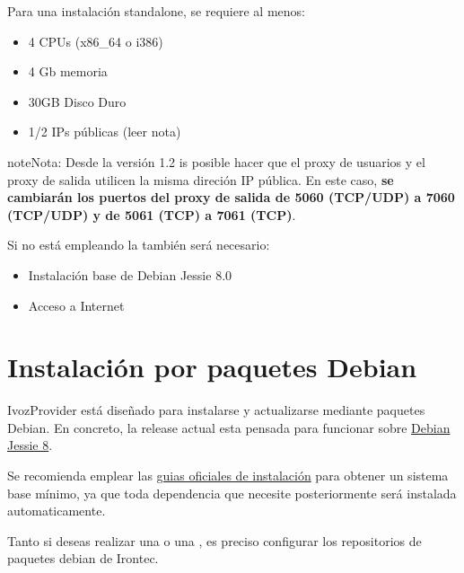 \documentclass[letterpaper,10pt,spanish]{sphinxmanual}
\begin{document}
Para una instalación standalone, se requiere al menos:
\begin{itemize}
\item {} 
4 CPUs (x86\_64 o i386)

\item {} 
4 Gb memoria

\item {} 
30GB Disco Duro

\item {} 
1/2 IPs públicas (leer nota)

\end{itemize}

\begin{notice}{note}{Nota:}
Desde la versión 1.2 is posible hacer que el proxy de usuarios y el proxy de salida utilicen la misma direción IP pública. En este caso, \textbf{se cambiarán los puertos del proxy de salida de 5060 (TCP/UDP) a 7060 (TCP/UDP) y de 5061 (TCP) a 7061 (TCP)}.
\end{notice}

Si no está empleando la {\hyperref[installation/cd_install:automatic\string-iso\string-cd\string-image]{}} también será necesario:
\begin{itemize}
\item {} 
Instalación base de Debian Jessie 8.0

\item {} 
Acceso a Internet

\end{itemize}


\section{Instalación por paquetes Debian}
\label{installation/debian_install::doc}\label{installation/debian_install:debian-packages-install}
IvozProvider está diseñado para instalarse y actualizarse mediante paquetes Debian. En concreto, la release actual esta pensada para funcionar sobre \href{https://www.debian.org/releases/jessie}{Debian Jessie 8}.

Se recomienda emplear las \href{https://www.debian.org/releases/jessie/installmanual}{guias oficiales de instalación} para obtener un sistema base mínimo, ya que toda dependencia que necesite posteriormente será instalada automaticamente.

Tanto si deseas realizar una {\hyperref[installation/install_types:standalone\string-install]{}} o una {\hyperref[installation/install_types:distributed\string-install]{}}, es preciso configurar los repositorios de paquetes debian de Irontec.
\end{document}
